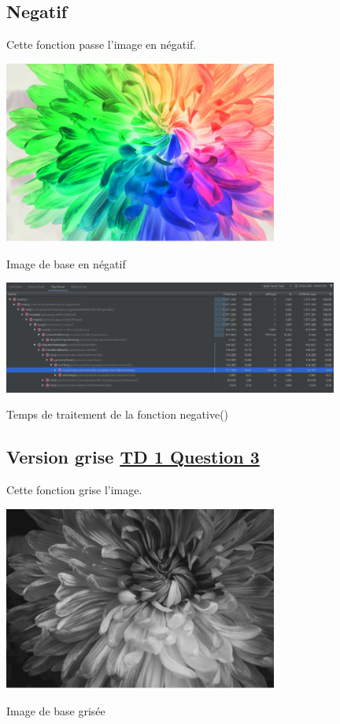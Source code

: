 \documentclass{article}
\begin{document}
\subsection{Negatif}
Cette fonction passe l'image en négatif.
\bigbreak

\begin{center} 
    \includegraphics[width=9cm]{../Negatif}

    Image de base en négatif
    \end{center}

\begin{center} 
    \includegraphics[width=11cm]{../TempsNegative}

    Temps de traitement de la fonction negative()
    \end{center}

\subsection{Version grise \underline{TD 1 Question 3}}
Cette fonction grise l'image.
\bigbreak

\begin{center} 
    \includegraphics[width=9cm]{../Gris}

    Image de base grisée
    \end{center}
\bigbreak
\end{document}
